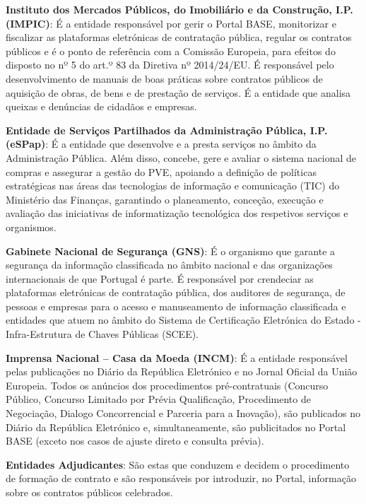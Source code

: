 \begin{my_enumerate}
	\item  \textbf{Instituto dos Mercados Públicos, do Imobiliário e da Construção, I.P. (IMPIC)}: É a entidade responsável por gerir o Portal BASE, monitorizar e fiscalizar as plataformas eletrónicas de contratação pública, regular os contratos públicos e é o ponto de referência com a Comissão Europeia, para efeitos do disposto no nº 5 do art.º 83 da Diretiva nº 2014/24/EU. É responsável pelo desenvolvimento de manuais de boas práticas sobre contratos públicos de aquisição de obras, de bens e de prestação de serviços. É a entidade que analisa queixas e denúncias de cidadãos e empresas.
	
	\item \textbf{Entidade de Serviços Partilhados da Administração Pública, I.P. (eSPap)}: É a entidade que desenvolve e a presta serviços no âmbito da Administração Pública. Além disso, concebe, gere e avaliar o sistema nacional de compras e assegurar a gestão do PVE, apoiando a definição de políticas estratégicas nas áreas das tecnologias de informação e comunicação (TIC) do Ministério das Finanças, garantindo o planeamento, conceção, execução e avaliação das iniciativas de informatização tecnológica dos respetivos serviços e organismos.
	
	\item \textbf{Gabinete Nacional de Segurança (GNS)}: É o organismo que garante a segurança da informação classificada no âmbito nacional e das organizações internacionais de que Portugal é parte. É responsável por crendeciar as plataformas eletrónicas de contratação pública, dos auditores de segurança, de pessoas e empresas para o acesso e manuseamento de informação classificada e entidades que atuem no âmbito do Sistema de Certificação Eletrónica do Estado - Infra-Estrutura de Chaves Públicas (SCEE).
	
	\item \textbf{Imprensa Nacional – Casa da Moeda (INCM)}: É a entidade responsável pelas publicações no Diário da República Eletrónico e no Jornal Oficial da União Europeia. Todos os anúncios dos procedimentos pré-contratuais (Concurso Público, Concurso Limitado por Prévia Qualificação, Procedimento de Negociação, Dialogo Concorrencial e Parceria para a Inovação), são publicados no Diário da República Eletrónico e, simultaneamente, são publicitados no Portal BASE (exceto nos casos de ajuste direto e consulta prévia).
	
	\item \textbf{Entidades Adjudicantes}: São estas que conduzem e decidem o procedimento de formação de contrato e são responsáveis por introduzir, no Portal, informação sobre os contratos públicos celebrados. 
	

\end{my_enumerate}
